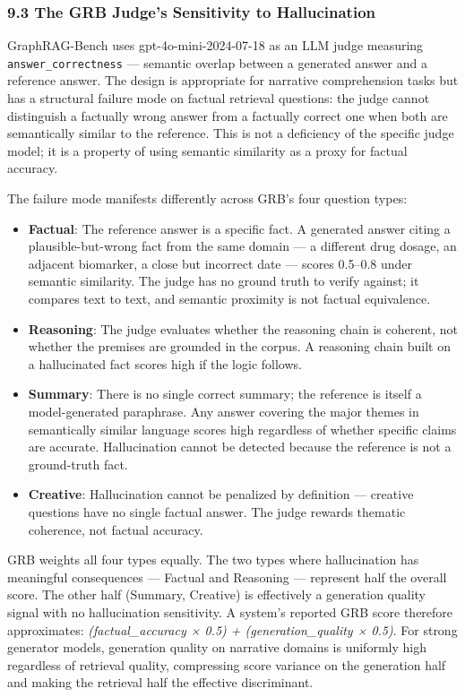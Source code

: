 \documentclass[
]{article}
\begin{document}
\subsubsection{9.3 The GRB Judge's Sensitivity to
Hallucination}\label{the-grb-judges-sensitivity-to-hallucination}

GraphRAG-Bench uses gpt-4o-mini-2024-07-18 as an LLM judge measuring
\texttt{answer\_correctness} --- semantic overlap between a generated
answer and a reference answer. The design is appropriate for narrative
comprehension tasks but has a structural failure mode on factual
retrieval questions: the judge cannot distinguish a factually wrong
answer from a factually correct one when both are semantically similar
to the reference. This is not a deficiency of the specific judge model;
it is a property of using semantic similarity as a proxy for factual
accuracy.

The failure mode manifests differently across GRB's four question types:

\begin{itemize}
\item
  \textbf{Factual}: The reference answer is a specific fact. A generated
  answer citing a plausible-but-wrong fact from the same domain --- a
  different drug dosage, an adjacent biomarker, a close but incorrect
  date --- scores 0.5--0.8 under semantic similarity. The judge has no
  ground truth to verify against; it compares text to text, and semantic
  proximity is not factual equivalence.
\item
  \textbf{Reasoning}: The judge evaluates whether the reasoning chain is
  coherent, not whether the premises are grounded in the corpus. A
  reasoning chain built on a hallucinated fact scores high if the logic
  follows.
\item
  \textbf{Summary}: There is no single correct summary; the reference is
  itself a model-generated paraphrase. Any answer covering the major
  themes in semantically similar language scores high regardless of
  whether specific claims are accurate. Hallucination cannot be detected
  because the reference is not a ground-truth fact.
\item
  \textbf{Creative}: Hallucination cannot be penalized by definition ---
  creative questions have no single factual answer. The judge rewards
  thematic coherence, not factual accuracy.
\end{itemize}

GRB weights all four types equally. The two types where hallucination
has meaningful consequences --- Factual and Reasoning --- represent half
the overall score. The other half (Summary, Creative) is effectively a
generation quality signal with no hallucination sensitivity. A system's
reported GRB score therefore approximates: \emph{(factual\_accuracy ×
0.5) + (generation\_quality × 0.5)}. For strong generator models,
generation quality on narrative domains is uniformly high regardless of
retrieval quality, compressing score variance on the generation half and
making the retrieval half the effective discriminant.
\end{document}

